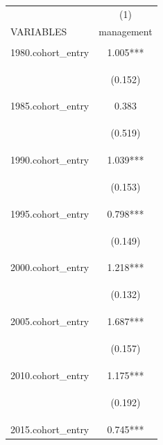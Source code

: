 \begin{center}
\begin{tabular}{lc} \hline
 & (1) \\
VARIABLES & management \\ \hline
\vspace{4pt} & \begin{footnotesize}\end{footnotesize} \\
1980.cohort\_entry & 1.005*** \\
\vspace{4pt} & \begin{footnotesize}(0.152)\end{footnotesize} \\
1985.cohort\_entry & 0.383 \\
\vspace{4pt} & \begin{footnotesize}(0.519)\end{footnotesize} \\
1990.cohort\_entry & 1.039*** \\
\vspace{4pt} & \begin{footnotesize}(0.153)\end{footnotesize} \\
1995.cohort\_entry & 0.798*** \\
\vspace{4pt} & \begin{footnotesize}(0.149)\end{footnotesize} \\
2000.cohort\_entry & 1.218*** \\
\vspace{4pt} & \begin{footnotesize}(0.132)\end{footnotesize} \\
2005.cohort\_entry & 1.687*** \\
\vspace{4pt} & \begin{footnotesize}(0.157)\end{footnotesize} \\
2010.cohort\_entry & 1.175*** \\
\vspace{4pt} & \begin{footnotesize}(0.192)\end{footnotesize} \\
2015.cohort\_entry & 0.745*** \\

\end{tabular}
\end{center}
